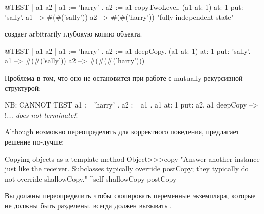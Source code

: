 \documentclass[a4paper,10pt,twoside]{book}
\begin{document}
\begin{code}{@TEST | a1 a2 |}
a1 := { { 'harry' } } .
a2 := a1 copyTwoLevel.
(a1 at: 1) at: 1 put: 'sally'.
a1 --> #(#('sally'))
a2 --> #(#('harry'))    "fully independent state"
\end{code}

 создает arbitrarily глубокую копию объекта.

\begin{code}{@TEST | a1 a2 |}
a1 := { { { 'harry' } } } .
a2 := a1 deepCopy.
(a1 at: 1) at: 1 put: 'sally'.
a1 --> #(#('sally'))
a2 --> #(#(#('harry')))
\end{code}

Проблема  в том, что оно не остановится при работе с mutually рекурсивной структурой:

\begin{code}{NB: CANNOT TEST}
a1 := { 'harry' }.
a2 := { a1 }.
a1 at: 1 put: a2.
a1 deepCopy --> !\emph{... does not terminate!}!
\end{code}

Although возможно переопределить  для корректного поведения,  предлагает решение по-лучше:

\begin{method}{Copying objects as a template method}
Object>>>copy
    "Answer another instance just like the receiver.
    Subclasses typically override postCopy;
    they typically do not override shallowCopy."
    ^self shallowCopy postCopy
\end{method}

Вы должны переопределить  чтобы скопировать переменные экземпляра, которые не должны быть разделены.  всегда должен вызывать .


\end{document}

